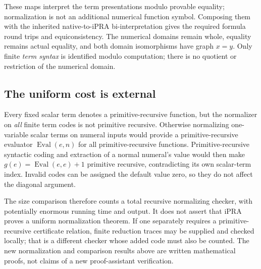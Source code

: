 These maps interpret the term presentations modulo provable equality;
normalization is not an additional numerical function symbol.  Composing
them with the inherited native-to-iPRA bi-interpretation gives the required
formula round trips and equiconsistency.  The numerical domains remain
whole, equality remains actual equality, and both domain isomorphisms have
graph $x=y$.  Only finite \emph{term syntax} is identified modulo computation;
there is no quotient or restriction of the numerical domain.

\subsection{The uniform cost is external}

Every fixed scalar term denotes a primitive-recursive function, but the
normalizer on \emph{all} finite term codes is not primitive recursive.
Otherwise normalizing one-variable scalar terms on numeral inputs would
provide a primitive-recursive evaluator $\operatorname{Eval}(e,n)$ for
all primitive-recursive functions.  Primitive-recursive syntactic coding
and extraction of a normal numeral's value would then make
$g(e)=\operatorname{Eval}(e,e)+1$ primitive recursive, contradicting its
own scalar-term index.  Invalid codes can be assigned the default value
zero, so they do not affect the diagonal argument.

The size comparison therefore counts a total recursive normalizing checker,
with potentially enormous running time and output.  It does not assert
that iPRA proves a uniform normalization theorem.  If one separately
requires a primitive-recursive certificate relation, finite reduction
traces may be supplied and checked locally; that is a different checker
whose added code must also be counted.  The new normalization and comparison
results above are written mathematical proofs, not claims of a new
proof-assistant verification.
